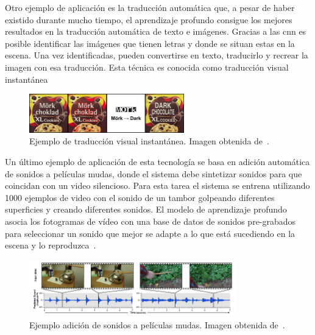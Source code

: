 Otro ejemplo de aplicación es la traducción automática que, a pesar de haber existido durante mucho tiempo, el aprendizaje profundo consigue los mejores resultados en la traducción automática de texto e imágenes. Gracias a las \acrshort{cnn} es posible identificar las imágenes que tienen letras y donde se situan estas en la escena. Una vez identificadas, pueden convertirse en texto, traducirlo y recrear la imagen con esa traducción. Esta técnica es conocida como traducción visual instantánea~\cite{traduccion}

\begin{figure}[H]
	\begin{center}
		\includegraphics[width=0.6\textwidth]{figures/traduccion}
		\caption{Ejemplo de traducción visual instantánea. Imagen obtenida de~\cite{traduccion}.}
	\end{center}
\end{figure}

Un último ejemplo de aplicación de esta tecnología se basa en adición automática de sonidos a películas mudas, donde el sistema debe sintetizar sonidos para que coincidan con un video silencioso. Para esta tarea el sistema se entrena utilizando 1000 ejemplos de video con el sonido de un tambor golpeando diferentes superficies y creando diferentes sonidos. El modelo de aprendizaje profundo asocia los fotogramas de vídeo con una base de datos de sonidos pre-grabados para seleccionar un sonido que mejor se adapte a lo que está sucediendo en la escena y lo reproduzca~\cite{2015arXiv151208512O}.

\begin{figure}[H]
	\begin{center}
		\includegraphics[width=0.8\textwidth]{figures/sonido}
		\caption{Ejemplo adición de sonidos a películas mudas. Imagen obtenida de~\cite{2015arXiv151208512O}.}
	\end{center}
\end{figure}


